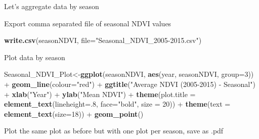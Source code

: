 \documentclass[]{article}
\newenvironment{Shaded}{\begin{snugshade}}{\end{snugshade}}
\newcommand{\KeywordTok}[1]{\textcolor[rgb]{0.13,0.29,0.53}{\textbf{{#1}}}}
\newcommand{\DataTypeTok}[1]{\textcolor[rgb]{0.13,0.29,0.53}{{#1}}}
\newcommand{\DecValTok}[1]{\textcolor[rgb]{0.00,0.00,0.81}{{#1}}}
\newcommand{\StringTok}[1]{\textcolor[rgb]{0.31,0.60,0.02}{{#1}}}
\newcommand{\OtherTok}[1]{\textcolor[rgb]{0.56,0.35,0.01}{{#1}}}
\newcommand{\NormalTok}[1]{{#1}}
\begin{document}
Let's aggregate data by season

\begin{Shaded}
\end{Shaded}

Export comma separated file of seasonal NDVI values

\begin{Shaded}
\begin{Highlighting}[]
\KeywordTok{write.csv}\NormalTok{(seasonNDVI, }\DataTypeTok{file=}\StringTok{"Seasonal_NDVI_2005-2015.csv"}\NormalTok{)}
\end{Highlighting}
\end{Shaded}

Plot data by season

\begin{Shaded}
\begin{Highlighting}[]
\NormalTok{Seasonal_NDVI_Plot<-}\KeywordTok{ggplot}\NormalTok{(seasonNDVI, }\KeywordTok{aes}\NormalTok{(year, seasonNDVI, }\DataTypeTok{group=}\DecValTok{3}\NormalTok{)) +}
\StringTok{  }\KeywordTok{geom_line}\NormalTok{(}\DataTypeTok{colour=}\StringTok{"red"}\NormalTok{) +}
\StringTok{  }\KeywordTok{ggtitle}\NormalTok{(}\StringTok{"Average NDVI (2005-2015) - Seasonal"}\NormalTok{) +}
\StringTok{  }\KeywordTok{xlab}\NormalTok{(}\StringTok{"Year"}\NormalTok{) +}\StringTok{ }\KeywordTok{ylab}\NormalTok{(}\StringTok{"Mean NDVI"}\NormalTok{) +}
\StringTok{  }\KeywordTok{theme}\NormalTok{(}\DataTypeTok{plot.title =} \KeywordTok{element_text}\NormalTok{(}\DataTypeTok{lineheight=}\NormalTok{.}\DecValTok{8}\NormalTok{, }\DataTypeTok{face=}\StringTok{"bold"}\NormalTok{,}
                                  \DataTypeTok{size =} \DecValTok{20}\NormalTok{)) +}
\StringTok{  }\KeywordTok{theme}\NormalTok{(}\DataTypeTok{text =} \KeywordTok{element_text}\NormalTok{(}\DataTypeTok{size=}\DecValTok{18}\NormalTok{)) +}\StringTok{ }\KeywordTok{geom_point}\NormalTok{()}
\end{Highlighting}
\end{Shaded}

Plot the same plot as before but with one plot per season, save as .pdf
\end{document}
